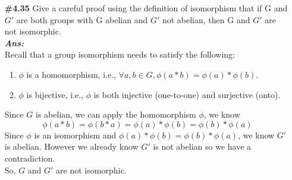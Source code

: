 \documentclass[12pt]{article}
\newcommand{\sol}{\setlength{\parindent}{0cm}\textbf{\textit{Ans:}}\setlength{\parindent}{1cm} }
\begin{document}
\begin{enumerate}[start=1,label={\bfseries Question \arabic*:},leftmargin=1in]
  \sol{}\\
  Recall that a permutation is one-to-one and onto function. Thus, we check these two properties.
  \begin{enumerate}
    \item \( f_3 \) is one-to-one: \\
    Assume \( f_3(x) = f_3(y) \), then \( -x^3 = -y^3 \) implies \( x = y \). Thus, \( f_3 \) is one-to-one.
    \item \( f_3 \) is onto: \\
    For any \( y \in \mathbb{R} \), we can find \( x = -\sqrt[3]{y} \in \mathbb{R} \) such that \\
    \( f_3(x) = -x^3 = -(-\sqrt[3]{y})^3 = y \). Thus, \( f_3 \) is onto.
  \end{enumerate}
  So since \( f_3 \) is one-to-one and onto, it is a permutation.
  \item[\textbf{\#4.35}] Give a careful proof using the definition of isomorphism that if G and $G'$ are both groups with G abelian and
  $G'$ not abelian, then G and $G'$ are not isomorphic.\\
  \sol{}\\
  Recall that a group isomorphism needs to satisfy the following:
  \begin{enumerate}
    \item $\phi$ is a homomorphism, i.e., $\forall a, b \in G, \phi(a * b) = \phi(a) * \phi(b)$.
    \item $\phi$ is bijective, i.e., $\phi$ is both injective (one-to-one) and surjective (onto).
  \end{enumerate} 
  Since $G$ is abelian, we can apply the homomorphism $\phi$, we know \[\phi(a*b) = \phi(b*a) = \phi(a)*\phi(b) = \phi(b)*\phi(a)\]
  Since $\phi$ is an isomorphism and $\phi(a)*\phi(b) = \phi(b)*\phi(a)$, we know $G'$ is abelian. 
  However we already know $G'$ is not abelian so we have a contradiction.\\
   So, $G$ and $G'$ are not isomorphic.


\end{enumerate}
\end{document}
